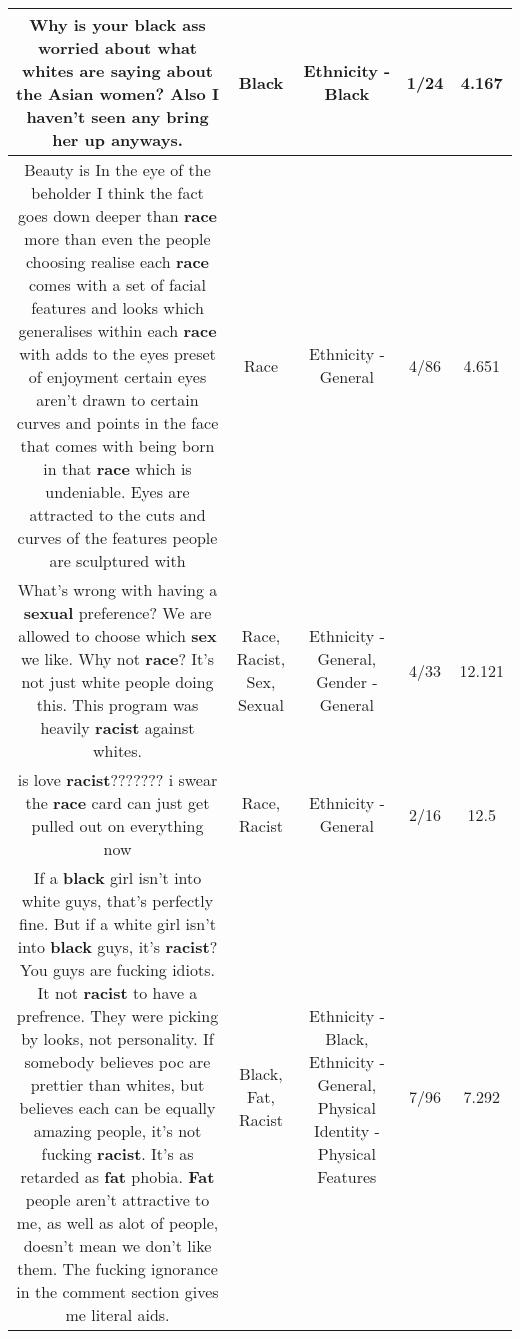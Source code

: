 \documentclass[11pt]{article}
\newlength\mylength
\begin{document}
\begin{center}
\begin{longtable}{|C{.65\mylength}|C{.30\mylength}|C{.12\mylength}|C{.12\mylength}|C{.12\mylength}|}
  \small Why is your \textbf{black} ass worried about what whites are saying about the Asian women? Also I haven't seen any bring her up anyways.\normalsize   & Black & Ethnicity - Black & 1/24 & 4.167 \\  \hline
  \small Beauty is In the eye of the beholder I think the fact goes down deeper than \textbf{race} more than even the people choosing realise each \textbf{race} comes with a set of facial features and looks which generalises within each \textbf{race} with adds to the eyes preset of enjoyment certain eyes aren't drawn to certain curves and points in the face that comes with being born in that \textbf{race} which is undeniable. Eyes are attracted to the cuts and curves of the features people are sculptured with\normalsize   & Race & Ethnicity - General & 4/86 & 4.651 \\  \hline
  \small What's wrong with having a \textbf{sexual} preference? We are allowed to choose which \textbf{sex} we like. Why not \textbf{race}? It's not just white people doing this. This program was heavily \textbf{racist} against whites.\normalsize   & Race, Racist, Sex, Sexual & Ethnicity - General, Gender - General & 4/33 & 12.121 \\  \hline
  \small is love \textbf{racist}??????? i swear the \textbf{race} card can just get pulled out on everything now\normalsize   & Race, Racist & Ethnicity - General & 2/16 & 12.5 \\  \hline
  \small If a \textbf{black} girl isn't into white guys, that's perfectly fine. But if a white girl isn't into  \textbf{black} guys, it's \textbf{racist}? You guys are fucking idiots. It not \textbf{racist} to have a prefrence. They were picking by looks, not personality. If somebody believes poc are prettier than whites, but believes each can be equally amazing people, it's not fucking \textbf{racist}. It's as retarded as \textbf{fat} phobia. \textbf{Fat} people aren't attractive to me, as well as alot of people, doesn't mean we don't like them. The fucking ignorance in the comment section gives me literal aids.\normalsize   & Black, Fat, Racist & Ethnicity - Black, Ethnicity - General, Physical Identity - Physical Features & 7/96 & 7.292 \\  \hline

\end{longtable}
\end{center}
\end{document}
